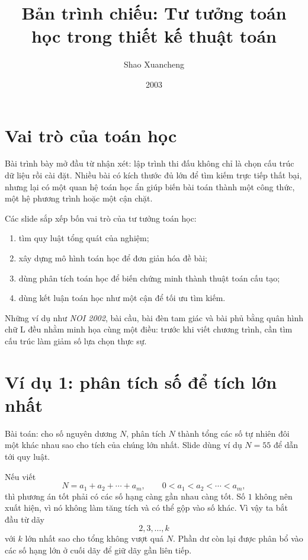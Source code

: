 \documentclass[11pt]{article}
\title{Bản trình chiếu: Tư tưởng toán học trong thiết kế thuật toán}
\author{Shao Xuancheng}
\date{2003}
\begin{document}
\maketitle


\section{Vai trò của toán học}

Bài trình bày mở đầu từ nhận xét: lập trình thi đấu không chỉ là chọn cấu
trúc dữ liệu rồi cài đặt. Nhiều bài có kích thước đủ lớn để tìm kiếm trực
tiếp thất bại, nhưng lại có một quan hệ toán học ẩn giúp biến bài toán thành
một công thức, một hệ phương trình hoặc một cận chặt.

Các slide sắp xếp bốn vai trò của tư tưởng toán học:
\begin{enumerate}
  \item tìm quy luật tổng quát của nghiệm;
  \item xây dựng mô hình toán học để đơn giản hóa đề bài;
  \item dùng phân tích toán học để biến chứng minh thành thuật toán cấu tạo;
  \item dùng kết luận toán học như một cận để tối ưu tìm kiếm.
\end{enumerate}
Những ví dụ như \textit{NOI 2002}, bài cầu, bài đèn tam giác và bài phủ bằng
quân hình chữ L đều nhằm minh họa cùng một điều: trước khi viết chương trình,
cần tìm cấu trúc làm giảm số lựa chọn thực sự.

\section{Ví dụ 1: phân tích số để tích lớn nhất}

Bài toán: cho số nguyên dương \(N\), phân tích \(N\) thành tổng các số tự
nhiên đôi một khác nhau sao cho tích của chúng lớn nhất. Slide dùng ví dụ
\(N=55\) để dẫn tới quy luật.

Nếu viết
\[
  N=a_1+a_2+\cdots+a_m,\qquad
  0<a_1<a_2<\cdots<a_m,
\]
thì phương án tốt phải có các số hạng càng gần nhau càng tốt. Số \(1\) không
nên xuất hiện, vì nó không làm tăng tích và có thể gộp vào số khác. Vì vậy ta
bắt đầu từ dãy
\[
  2,3,\ldots,k
\]
với \(k\) lớn nhất sao cho tổng không vượt quá \(N\). Phần dư còn lại được
phân bổ vào các số hạng lớn ở cuối dãy để giữ dãy gần liên tiếp.
\end{document}
